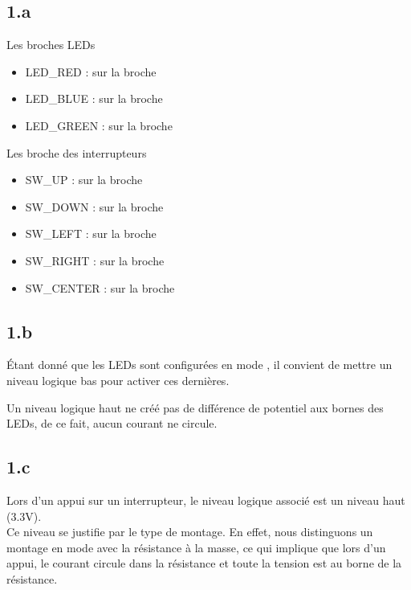 {\subsection{1.a}

Les broches LEDs 

\begin{itemize}

  \item LED\_RED :  sur la broche 
  \item LED\_BLUE :  sur la broche 
  \item LED\_GREEN :  sur la broche 

\end{itemize}

Les broche des interrupteurs 

\begin{itemize}

  \item SW\_UP :  sur la broche 
  \item SW\_DOWN :  sur la broche 
  \item SW\_LEFT :  sur la broche 
  \item SW\_RIGHT :  sur la broche 
  \item SW\_CENTER :  sur la broche 

\end{itemize}

\subsection{1.b}

Étant donné que les LEDs sont configurées en mode , 
il convient de mettre un niveau logique bas pour activer ces dernières. \\


Un niveau logique haut ne créé pas de différence de potentiel aux bornes des LEDs, de ce fait, aucun courant ne circule.
  
\subsection{1.c}

Lors d'un appui sur un interrupteur, le niveau logique associé est un niveau haut (3.3V). \\
Ce niveau se justifie par le type de montage. En effet, nous distinguons un montage en mode  
avec la résistance à la masse, ce qui implique que lors d'un appui, le courant circule dans
la résistance et toute la tension est au borne de la résistance.

}
